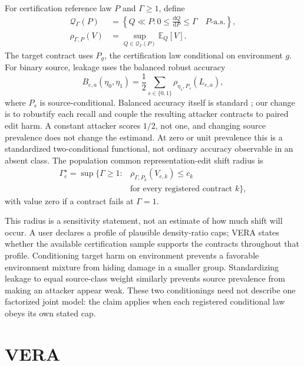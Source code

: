 For certification reference law $P$ and $\Gamma\ge1$, define
\begin{equation}
\begin{aligned}
\mathcal Q_\Gamma(P)&=\left\{Q\ll P:0\le
\frac{\mathrm dQ}{\mathrm dP}\le\Gamma\quad P\text{-a.s.}\right\},\\
\rho_{\Gamma,P}(V)&=\sup_{Q\in\mathcal Q_\Gamma(P)}\mathbb E_Q[V].
\end{aligned}
\end{equation}
The target contract uses $P_g$, the certification law conditional on
environment $g$. For binary source, leakage uses the balanced robust accuracy
\begin{equation}
B_{e,a}(\eta_0,\eta_1)=\frac12\sum_{s\in\{0,1\}}
\rho_{\eta_s,P_s}(L_{e,a}),
\end{equation}
where $P_s$ is source-conditional. Balanced accuracy itself is standard
\cite{brodersen2010balanced}; our change is to robustify each recall and couple
the resulting attacker contracts to paired edit harm. A constant attacker
scores $1/2$, not one, and changing source prevalence does not change the
estimand. At zero or unit prevalence this is a standardized two-conditional
functional, not ordinary accuracy observable in an absent class. The population
common representation-edit shift radius is
\begin{equation}
\begin{aligned}
\Gamma_e^\star=\sup\{\Gamma\ge1:
&\rho_{\Gamma,P_k}(V_{e,k})\le c_k\\
&\text{for every registered contract }k\},
\end{aligned}
\end{equation}
with value zero if a contract fails at $\Gamma=1$.

This radius is a sensitivity statement, not an estimate of how much shift will
occur. A user declares a profile of plausible density-ratio caps; VERA states
whether the available certification sample supports the contracts throughout
that profile. Conditioning target harm on environment prevents a favorable
environment mixture from hiding damage in a smaller group. Standardizing
leakage to equal source-class weight similarly prevents source prevalence from
making an attacker appear weak. These two conditionings need not describe one
factorized joint model: the claim applies when each registered conditional law
obeys its own stated cap.

\section{VERA}

